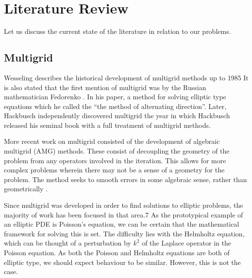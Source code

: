 
\section{Literature Review}

\iffalse

Topics to cover:
	Solving Poisson problem
	Solving Helmholtz
	Complex shifted laplacian
	Multigrid
	Cylindrical coordinates

Mention one or two references for each, try and reach >2 pages.

\fi

Let us discuss the current state of the literature in relation to our problems.

\subsection{Multigrid}

Wesseling \cite{wesseling} describes the historical development of multigrid methods up to 1985
It is also stated that the first mention of multigrid was by the Russian mathematician Fedorenko \cite{fedorenko}.
In his paper, a method for solving elliptic type equations which he called the ``the method of alternating direction''.
Later, Hackbusch independently discovered multigrid
the year in which Hackbusch \cite{hackbusch} released his seminal book with a full treatment of multigrid methods.


More recent work on multigrid consisted of the development of algebraic multigrid (AMG) methods.
These consist of decoupling the geometry of the problem from any operators involved in the iteration.
This allows for more complex problems wherein there may not be a sense of a geometry for the problem.
The method seeks to smooth errors in some algebraic sense, rather than geometrically \cite{}.%

Since multigrid was developed in order to find solutions to elliptic problems, the majority of work has been focused in that area.7
As the prototypical example of an elliptic PDE is Poisson's equation, we can be certain that the mathematical framework for solving this is set.
The difficulty lies with the Helmholtz equation, which can be thought of a perturbation by $k^2$ of the Laplace operator in the Poisson equation.
As both the Poisson and Helmholtz equations are both of elliptic type, we should expect behaviour to be similar.
However, this is not the case.

